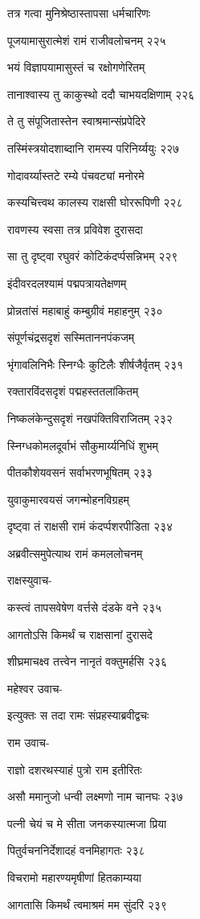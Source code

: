 तत्र गत्वा मुनिश्रेष्ठास्तापसा धर्मचारिणः

पूजयामासुरात्मेशं रामं राजीवलोचनम् २२५

भयं विज्ञापयामासुस्तं च रक्षोगणेरितम्

तानाश्वास्य तु काकुस्थो ददौ चाभयदक्षिणाम् २२६

ते तु संपूजितास्तेन स्वाश्रमान्संप्रपेदिरे

तस्मिंस्त्रयोदशाब्दानि रामस्य परिनिर्य्ययुः २२७

गोदावर्य्यास्तटे रम्ये पंचवट्यां मनोरमे

कस्यचित्त्वथ कालस्य राक्षसी घोररूपिणी २२८

रावणस्य स्वसा तत्र प्रविवेश दुरासदा

सा तु दृष्ट्वा रघुवरं कोटिकंदर्प्पसन्निभम् २२९

इंदीवरदलश्यामं पद्मपत्रायतेक्षणम्

प्रोन्नतांसं महाबाहुं कम्बुग्रीवं महाहनुम् २३०

संपूर्णचंद्रसदृशं सस्मिताननपंकजम्

भृंगावलिनिभैः स्निग्धैः कुटिलैः शीर्षजैर्वृतम् २३१

रक्तारविंदसदृशं पद्महस्ततलांकितम्

निष्कलंकेन्दुसदृशं नखपंक्तिविराजितम् २३२

स्निग्धकोमलदूर्वाभं सौकुमार्य्यनिधिं शुभम्

पीतकौशेयवसनं सर्वाभरणभूषितम् २३३

युवाकुमारवयसं जगन्मोहनविग्रहम्

दृष्ट्वा तं राक्षसी रामं कंदर्प्पशरपीडिता २३४

अब्रवीत्समुपेत्याथ रामं कमललोचनम्

राक्षस्युवाच-

कस्त्वं तापसवेषेण वर्त्तसे दंडके वने २३५

आगतोऽसि किमर्थं च राक्षसानां दुरासदे

शीघ्रमाचक्ष्व तत्त्वेन नानृतं वक्तुमर्हसि २३६

महेश्वर उवाच-

इत्युक्तः स तदा रामः संप्रहस्याब्रवीद्वचः

राम उवाच-

राज्ञो दशरथस्याहं पुत्रो राम इतीरितः

असौ ममानुजो धन्वी लक्ष्मणो नाम चानघः २३७

पत्नी चेयं च मे सीता जनकस्यात्मजा प्रिया

पितुर्वचननिर्देशादहं वनमिहागतः २३८

विचरामो महारण्यमृषीणां हितकाम्यया

आगतासि किमर्थं त्वमाश्रमं मम सुंदरि २३९


